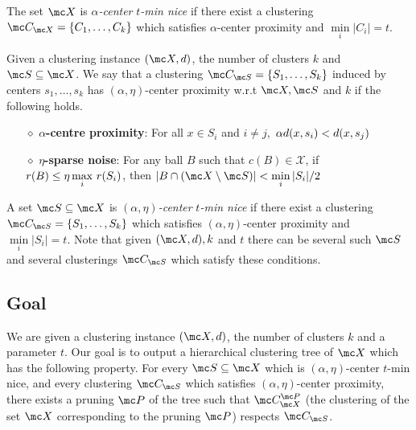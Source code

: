 \documentclass[11pt]{article}
\begin{document}
\noindent The set $\mc X$ is {\it $\alpha$-center} {\it $t$-min nice} if there exist a clustering $\mc C_{\mc X}=\{C_1,\ldots,C_k\}$ which satisfies $\alpha$-center proximity and $\min\limits_{i} \lvert C_i\rvert = t$.

\begin{definition}
Given a clustering instance $(\mc X, d)$, the number of clusters $k$ and $\mc S \subseteq \mc X$. We say that a clustering $\mc C_{\mc S} = \{S_1, \ldots, S_k\}$ induced by centers $s_1, \ldots, s_k$ has $(\alpha, \eta)$-center proximity w.r.t $\mc X, \mc S$ and $k$ if the following holds.

\begin{itemize}[nolistsep, noitemsep]
\label{defn:alphacpnoise}	

\item[$\diamond$] {\bf $\alpha$-centre proximity}: For all $x \in S_i$ and $i\neq j$, $\thinspace\alpha d(x, s_i) < d(x, s_j)$
\item[$\diamond$]{\bf $\eta$-sparse noise}: For any ball $B$ such that $c(B)\in \mathcal{X}$, if $r(B)\leq \eta\max\limits_{i} \thinspace r(S_i)$, then $|B\cap (\mc X\setminus \mc S)| < \min\limits_{i} |S_i|/2$
\end{itemize}
\end{definition}

\noindent A set $\mc S \subseteq \mc X$ is {\it $(\alpha, \eta)$-center} {\it $t$-min nice} if there exist a clustering $\mc C_{\mc S}=\{S_1,\ldots,S_k\}$ which satisfies $(\alpha, \eta)$-center proximity and $\min\limits_{i} \lvert S_i\rvert = t$. Note that given $(\mc X, d), k$ and $t$ there can be several such $\mc S$ and several clusterings $\mc C_{\mc S}$ which satisfy these conditions.


\subsection{Goal}
We are given a clustering instance $(\mc X, d)$, the number of clusters $k$ and a parameter $t$. Our goal is to output a hierarchical clustering tree of $\mc X$ which has the following property. For every $\mc S \subseteq \mc X$ which is $(\alpha, \eta)$-center $t$-min nice, and every clustering $\mc C_{\mc S}$ which satisfies $(\alpha, \eta)$-center proximity, there exists a pruning $\mc P$ of the tree such that $\mc C_{\mc X}^{\mc P}$ (the clustering of the set $\mc X$ corresponding to the pruning $\mc P$) respects $\mc C_{\mc S}$. 
\end{document}
